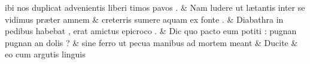 \documentclass[12pt,onecolumn,twoside,a4paper]{memoir}
\begin{document}
\begin{pairs}
\begin{Leftside}
                              ibi
                              nos
                              duplicat
                              advenientis
                              liberi
                              timos
                              pavos
                              . \&
                         \stanza {}Nam
                              ludere
                              ut
                              lætantis
                              inter
                              se
                              vidimus
                              præter
                              amnem & 
                     creterris
                              sumere
                              aquam
                              ex
                              fonte
                              . \&
                         \stanza {}
                     Diabathra
                              in
                              pedibus
                              habebat
                              ,
                              erat
                              amictus
                              epicroco
                              . \&
                         \stanza {}
                     Dic
                              quo
                              pacto
                              eum
                              potiti
                              :
                              pugnan
                              {pugnan}
                              an
                              dolis
                              ? \&
                         \stanza {}
                     sine
                              ferro
                              ut
                              pecua
                              manibus
                              ad
                              mortem
                              meant \&
                         \stanza {}Ducite & 
                     eo
                              cum
                              argutis
                              linguis

\end{Leftside}
\end{pairs}
\end{document}
